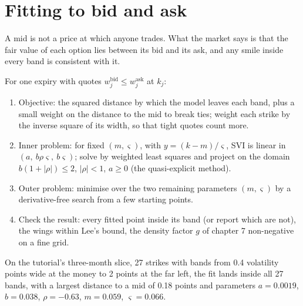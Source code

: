 \section{Fitting to bid and ask}

A mid is not a price at which anyone trades. What the market says is that the fair value of each
option lies between its bid and its ask, and any smile inside every band is consistent with it.

\begin{method}\label{met:dv:parametrising-the-surface:fit}
For one expiry with quotes $w^{\mathrm{bid}}_j\le w^{\mathrm{ask}}_j$ at $k_j$:
\begin{enumerate}
\item Objective: the squared distance by which the model leaves each band, plus a small weight on
the distance to the mid to break ties; weight each strike by the inverse square of its width, so
that tight quotes count more.
\item Inner problem: for fixed $(m,\varsigma)$, with $y=(k-m)/\varsigma$, SVI is linear in
$(a,\ b\rho\varsigma,\ b\varsigma)$; solve by weighted least squares and project on the domain
$b(1+|\rho|)\le2$, $|\rho|<1$, $a\ge0$ (the quasi-explicit method).
\item Outer problem: minimise over the two remaining parameters $(m,\varsigma)$ by a derivative-free
search from a few starting points.
\item Check the result: every fitted point inside its band (or report which are not), the wings within
Lee's bound, the density factor $g$ of chapter 7 non-negative on a fine grid.
\end{enumerate}
\end{method}

On the tutorial's three-month slice, 27 strikes with bands from 0.4 volatility points wide at the
money to 2 points at the far left, the fit lands inside all 27 bands, with a largest distance to a mid
of 0.18 points and parameters $a=0.0019$, $b=0.038$, $\rho=-0.63$, $m=0.059$, $\varsigma=0.066$.

